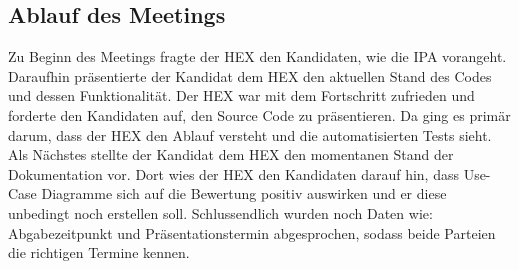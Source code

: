 \subsection{Ablauf des Meetings}
Zu Beginn des Meetings fragte der HEX den Kandidaten, wie die IPA vorangeht. Daraufhin präsentierte der Kandidat dem HEX
den aktuellen Stand des Codes und dessen Funktionalität. Der HEX war mit dem Fortschritt zufrieden und forderte den
Kandidaten auf, den Source Code zu präsentieren. Da ging es primär darum, dass der HEX den Ablauf versteht und die
automatisierten Tests sieht. \newline
Als Nächstes stellte der Kandidat dem HEX den momentanen Stand der Dokumentation vor. Dort wies der HEX den Kandidaten
darauf hin, dass Use-Case Diagramme sich auf die Bewertung positiv auswirken und er diese unbedingt noch erstellen soll.
\newline
Schlussendlich wurden noch Daten wie: Abgabezeitpunkt und Präsentationstermin abgesprochen, sodass beide Parteien
die richtigen Termine kennen. \newline
